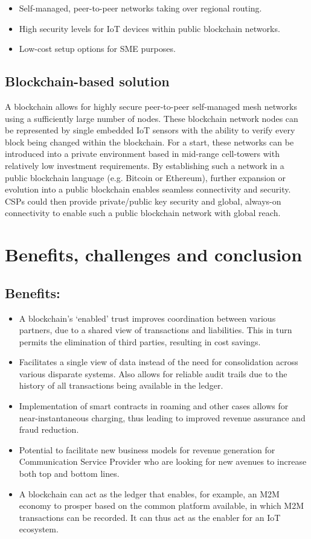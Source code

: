 \documentclass[12pt]{article}
\begin{document}
\begin{itemize}
	\item Self-managed, peer-to-peer
	networks taking over regional
	routing.
	\item High security levels for IoT devices
	within public blockchain networks.
	\item Low-cost setup options for SME
	purposes.
	
\end{itemize}
\frameboxend

\subsection{Blockchain-based solution}
A blockchain allows for highly
secure peer-to-peer self-managed
mesh networks using a sufficiently
large number of nodes. These blockchain
network nodes can be represented by
single embedded IoT sensors with the
ability to verify every block being changed
within the blockchain. For a start, these
networks can be introduced into a private
environment based in mid-range cell-towers
with relatively low investment requirements.
By establishing such a network in a
public blockchain language (e.g. Bitcoin or
Ethereum), further expansion or evolution
into a public blockchain enables seamless
connectivity and security. CSPs could then
provide private/public key security and
global, always-on connectivity to enable
such a public blockchain network with
global reach.
\section{Benefits, challenges and conclusion}
\subsection{Benefits:}
\begin{itemize}
	\item A blockchain’s ‘enabled’ trust improves
	coordination between various
	partners, due to a shared view of
	transactions and liabilities. This in
	turn permits the elimination of third
	parties, resulting in cost savings.
	\item Facilitates a single view of data instead
	of the need for consolidation across
	various disparate systems. Also allows
	for reliable audit trails due to the history
	of all transactions being available in
	the ledger.
	\item Implementation of smart contracts
	in roaming and other cases allows for
	near-instantaneous charging, thus
	leading to improved revenue assurance
	and fraud reduction.
	\item Potential to facilitate new business
	models for revenue generation for
	Communication Service Provider
	who are looking for new avenues to
	increase both top and bottom lines.
	\item A blockchain can act as the ledger
	that enables, for example, an M2M
	economy to prosper based on the
	common platform available, in which
	M2M transactions can be recorded. It
	can thus act as the enabler for an IoT
	ecosystem.
\end{itemize}
\end{document}
